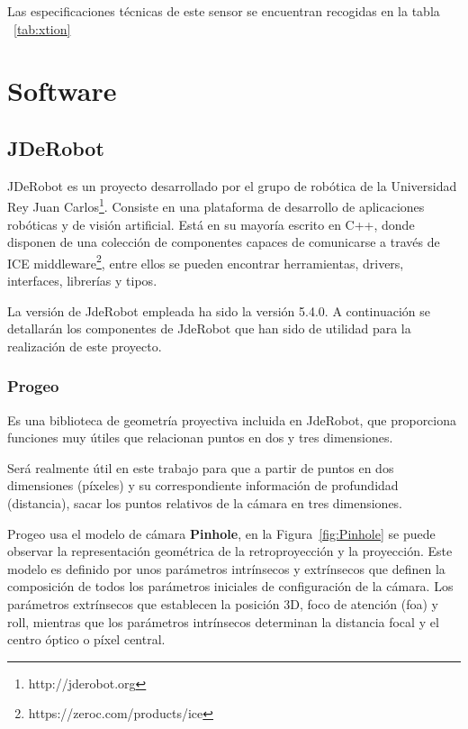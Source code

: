 Las especificaciones técnicas de este sensor se encuentran recogidas en la tabla ~\ref{tab:xtion}
\section{Software}

\subsection{JDeRobot}

JDeRobot es un proyecto desarrollado por el grupo de robótica de la Universidad Rey Juan Carlos\footnote{http://jderobot.org}. Consiste en una plataforma de desarrollo de aplicaciones robóticas y de visión artificial. Está en su mayoría escrito en C++, donde disponen de una colección de componentes capaces de comunicarse a través de ICE middleware\footnote{https://zeroc.com/products/ice}, entre ellos se pueden encontrar herramientas, drivers, interfaces, librerías y tipos.

La versión de JdeRobot empleada ha sido la versión 5.4.0. A continuación se detallarán los componentes de JdeRobot que han sido de utilidad para la realización de este proyecto.


\subsubsection{Progeo}

Es una biblioteca de geometría proyectiva incluida en JdeRobot, que proporciona funciones muy útiles que relacionan puntos en dos y tres dimensiones.

Será realmente útil en este trabajo para que a partir de puntos en dos dimensiones (píxeles) y su correspondiente información de profundidad (distancia), sacar los puntos relativos de la cámara en tres dimensiones.

Progeo usa el modelo de cámara \textbf{Pinhole}, en la Figura~\ref{fig:Pinhole} se puede observar la representación geométrica de la retroproyección y la proyección. Este modelo es definido por unos parámetros intrínsecos y extrínsecos que definen la composición de todos los parámetros iniciales de configuración de la cámara. Los parámetros extrínsecos que establecen la posición 3D, foco de atención (foa) y roll, mientras que los parámetros intrínsecos determinan la distancia focal y el centro óptico o píxel central.

